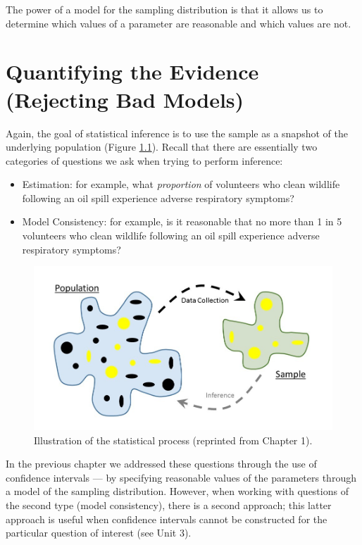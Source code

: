 \documentclass[]{book}
\providecommand{\tightlist}{%
  \setlength{\itemsep}{0pt}\setlength{\parskip}{0pt}}
\theoremstyle{plain}
\theoremstyle{mydefn}
\theoremstyle{myexmpl}
\theoremstyle{remark}
\begin{document}
The power of a model for the sampling distribution is that it allows us
to determine which values of a parameter are reasonable and which values
are not.

\chapter{Quantifying the Evidence (Rejecting Bad
Models)}\label{NullDistns}

Again, the goal of statistical inference is to use the sample as a
snapshot of the underlying population (Figure
\ref{fig:nulldistns-statistical-process}). Recall that there are
essentially two categories of questions we ask when trying to perform
inference:

\begin{itemize}
\tightlist
\item
  Estimation: for example, what \emph{proportion} of volunteers who
  clean wildlife following an oil spill experience adverse respiratory
  symptoms?
\item
  Model Consistency: for example, is it reasonable that no more than 1
  in 5 volunteers who clean wildlife following an oil spill experience
  adverse respiratory symptoms?
\end{itemize}

\begin{figure}

{\centering \includegraphics[width=0.8\linewidth]{images/Basics-Stat-Process} 

}

\caption{Illustration of the statistical process (reprinted from Chapter 1).}\label{fig:nulldistns-statistical-process}
\end{figure}

In the previous chapter we addressed these questions through the use of
confidence intervals --- by specifying reasonable values of the
parameters through a model of the sampling distribution. However, when
working with questions of the second type (model consistency), there is
a second approach; this latter approach is useful when confidence
intervals cannot be constructed for the particular question of interest
(see Unit 3).
\end{document}
